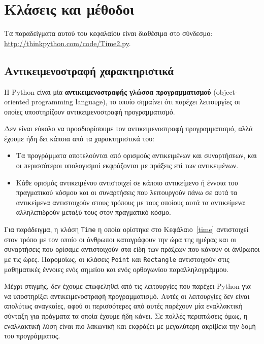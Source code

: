 \documentclass[10pt]{book}
\begin{document}
\chapter{Κλάσεις και μέθοδοι}

Τα παραδείγματα αυτού του κεφαλαίου είναι διαθέσιμα στο σύνδεσμο: 
\url{http://thinkpython.com/code/Time2.py}. 

\section{Αντικειμενοστραφή χαρακτηριστικά}

Η Python είναι μία {\bf αντικειμενοστραφής γλώσσα προγραμματισμού} (object-oriented programming language),
το οποίο σημαίνει ότι παρέχει λειτουργίες οι οποίες υποστηρίζουν αντικειμενοστραφή προγραμματισμό.

Δεν είναι εύκολο να προσδιορίσουμε τον αντικειμενοστραφή προγραμματισμό, αλλά έχουμε ήδη δει κάποια από τα
χαρακτηριστικά του: 


\begin{itemize}

\item Τα προγράμματα αποτελούνται από ορισμούς αντικειμένων και συναρτήσεων, και οι περισσότεροι υπολογισμοί
εκφράζονται με πράξεις επί των αντικειμένων.

\item Κάθε ορισμός αντικειμένου αντιστοιχεί σε κάποιο αντικείμενο ή έννοια του πραγματικού
κόσμου και οι συναρτήσεις που λειτουργούν πάνω σε αυτά τα αντικείμενα αντιστοιχούν στους τρόπους
με τους οποίους αυτά τα αντικείμενα αλληλεπιδρούν μεταξύ τους στον πραγματικό κόσμο.

\end{itemize}

Για παράδειγμα, η κλάση {\tt Time} η οποία ορίστηκε στο Κεφάλαιο~\ref{time} αντιστοιχεί στον τρόπο με
τον οποίο οι άνθρωποι καταγράφουν την ώρα της ημέρας και οι συναρτήσεις που ορίσαμε αντιστοιχούν στα είδη των
πράξεων που κάνουν οι άνθρωποι με τις ώρες. Παρομοίως, οι κλάσεις {\tt Point} και {\tt Rectangle} αντιστοιχούν
στις μαθηματικές έννοιες ενός σημείου και ενός ορθογωνίου παραλληλογράμμου.

Μέχρι στιγμής, δεν έχουμε επωφεληθεί από τις λειτουργίες που παρέχει Python για να υποστηρίξει αντικειμενοστραφή
προγραμματισμό. Αυτές οι λειτουργίες δεν είναι απολύτως αναγκαίες, αφού οι περισσότερες από αυτές παρέχουν μία εναλλακτική σύνταξη για πράγματα τα οποία έχουμε ήδη κάνει. Σε πολλές περιπτώσεις όμως, η εναλλακτική λύση είναι
πιο λακωνική και εκφράζει με μεγαλύτερη ακρίβεια την δομή του προγράμματος.
\end{document}
